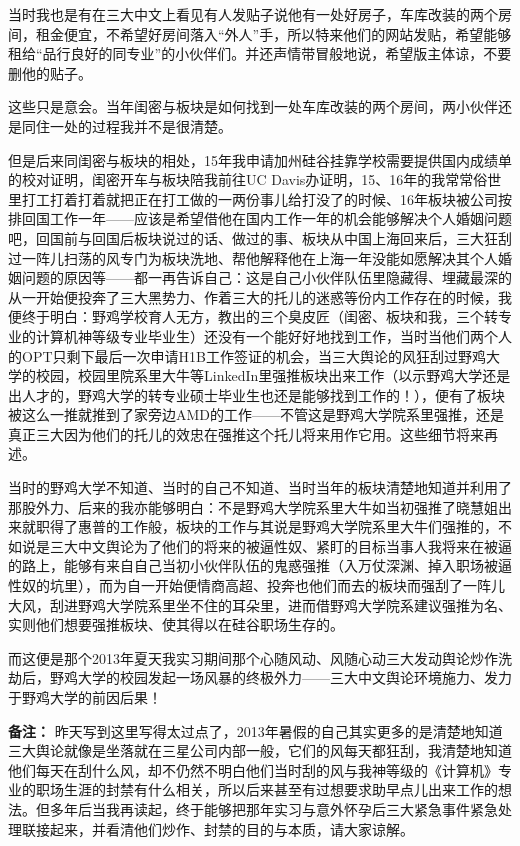 \documentclass[9pt, b5paper]{article}
\begin{document}
当时我也是有在三大中文上看见有人发贴子说他有一处好房子，车库改装的两个房间，租金便宜，不希望好房间落入“外人”手，所以特来他们的网站发贴，希望能够租给“品行良好的同专业”的小伙伴们。并还声情带冒般地说，希望版主体谅，不要删他的贴子。 

这些只是意会。当年闺密与板块是如何找到一处车库改装的两个房间，两小伙伴还是同住一处的过程我并不是很清楚。

但是后来同闺密与板块的相处，15年我申请加州硅谷挂靠学校需要提供国内成绩单的校对证明，闺密开车与板块陪我前往UC Davis办证明，15、16年的我常常俗世里打工打着打着就把正在打工做的一两份事儿给打没了的时候、16年板块被公司按排回国工作一年——应该是希望借他在国内工作一年的机会能够解决个人婚姻问题吧，回国前与回国后板块说过的话、做过的事、板块从中国上海回来后，三大狂刮过一阵儿扫荡的风专门为板块洗地、帮他解释他在上海一年没能如愿解决其个人婚姻问题的原因等——都一再告诉自己：这是自己小伙伴队伍里隐藏得、埋藏最深的从一开始便投奔了三大黑势力、作着三大的托儿的迷惑等份内工作存在的时候，我便终于明白：野鸡学校育人无方，教出的三个臭皮匠（闺密、板块和我，三个转专业的计算机神等级专业毕业生）还没有一个能好好地找到工作，当时当他们两个人的OPT只剩下最后一次申请H1B工作签证的机会，当三大舆论的风狂刮过野鸡大学的校园，校园里院系里大牛等LinkedIn里强推板块出来工作（以示野鸡大学还是出人才的，野鸡大学的转专业硕士毕业生也还是能够找到工作的！），便有了板块被这么一推就推到了家旁边AMD的工作——不管这是野鸡大学院系里强推，还是真正三大因为他们的托儿的效忠在强推这个托儿将来用作它用。这些细节将来再述。

当时的野鸡大学不知道、当时的自己不知道、当时当年的板块清楚地知道并利用了那股外力、后来的我亦能够明白：不是野鸡大学院系里大牛如当初强推了晓慧姐出来就职得了惠普的工作般，板块的工作与其说是野鸡大学院系里大牛们强推的，不如说是三大中文舆论为了他们的将来的被逼性奴、紧盯的目标当事人我将来在被逼的路上，能够有来自自己当初小伙伴队伍的鬼惑强推（入万仗深渊、掉入职场被逼性奴的坑里），而为自一开始便情商高超、投奔也他们而去的板块而强刮了一阵儿大风，刮进野鸡大学院系里坐不住的耳朵里，进而借野鸡大学院系建议强推为名、实则他们想要强推板块、使其得以在硅谷职场生存的。

而这便是那个2013年夏天我实习期间那个心随风动、风随心动三大发动舆论炒作洗劫后，野鸡大学的校园发起一场风暴的终极外力——三大中文舆论环境施力、发力于野鸡大学的前因后果！

\textbf{备注：} 昨天写到这里写得太过点了，2013年暑假的自己其实更多的是清楚地知道三大舆论就像是坐落就在三星公司内部一般，它们的风每天都狂刮，我清楚地知道他们每天在刮什么风，却不仍然不明白他们当时刮的风与我神等级的《计算机》专业的职场生涯的封禁有什么相关，所以后来甚至有过想要求助早点儿出来工作的想法。但多年后当我再读起，终于能够把那年实习与意外怀孕后三大紧急事件紧急处理联接起来，并看清他们炒作、封禁的目的与本质，请大家谅解。 
\end{document}
